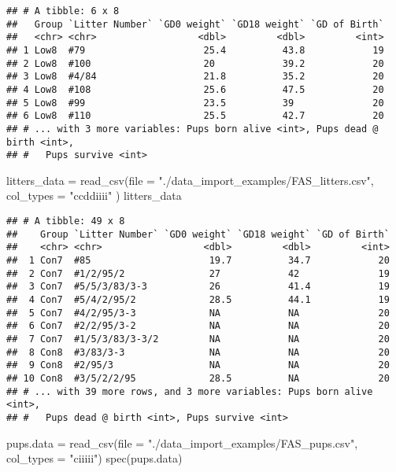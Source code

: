 \documentclass[
]{article}
\newenvironment{Shaded}{\begin{snugshade}}{\end{snugshade}}
\newcommand{\AttributeTok}[1]{\textcolor[rgb]{0.77,0.63,0.00}{#1}}
\newcommand{\FunctionTok}[1]{\textcolor[rgb]{0.00,0.00,0.00}{#1}}
\newcommand{\NormalTok}[1]{#1}
\newcommand{\OtherTok}[1]{\textcolor[rgb]{0.56,0.35,0.01}{#1}}
\newcommand{\StringTok}[1]{\textcolor[rgb]{0.31,0.60,0.02}{#1}}
\begin{document}
\begin{verbatim}
## # A tibble: 6 x 8
##   Group `Litter Number` `GD0 weight` `GD18 weight` `GD of Birth`
##   <chr> <chr>                  <dbl>         <dbl>         <int>
## 1 Low8  #79                     25.4          43.8            19
## 2 Low8  #100                    20            39.2            20
## 3 Low8  #4/84                   21.8          35.2            20
## 4 Low8  #108                    25.6          47.5            20
## 5 Low8  #99                     23.5          39              20
## 6 Low8  #110                    25.5          42.7            20
## # ... with 3 more variables: Pups born alive <int>, Pups dead @ birth <int>,
## #   Pups survive <int>
\end{verbatim}

\begin{Shaded}
\begin{Highlighting}[]
\NormalTok{litters\_data }\OtherTok{=} \FunctionTok{read\_csv}\NormalTok{(}\AttributeTok{file =} \StringTok{"./data\_import\_examples/FAS\_litters.csv"}\NormalTok{,}
  \AttributeTok{col\_types =} \StringTok{"ccddiiii"}
\NormalTok{)}
\NormalTok{litters\_data}
\end{Highlighting}
\end{Shaded}

\begin{verbatim}
## # A tibble: 49 x 8
##    Group `Litter Number` `GD0 weight` `GD18 weight` `GD of Birth`
##    <chr> <chr>                  <dbl>         <dbl>         <int>
##  1 Con7  #85                     19.7          34.7            20
##  2 Con7  #1/2/95/2               27            42              19
##  3 Con7  #5/5/3/83/3-3           26            41.4            19
##  4 Con7  #5/4/2/95/2             28.5          44.1            19
##  5 Con7  #4/2/95/3-3             NA            NA              20
##  6 Con7  #2/2/95/3-2             NA            NA              20
##  7 Con7  #1/5/3/83/3-3/2         NA            NA              20
##  8 Con8  #3/83/3-3               NA            NA              20
##  9 Con8  #2/95/3                 NA            NA              20
## 10 Con8  #3/5/2/2/95             28.5          NA              20
## # ... with 39 more rows, and 3 more variables: Pups born alive <int>,
## #   Pups dead @ birth <int>, Pups survive <int>
\end{verbatim}

\begin{Shaded}
\begin{Highlighting}[]
\NormalTok{pups.data }\OtherTok{=} \FunctionTok{read\_csv}\NormalTok{(}\AttributeTok{file =} \StringTok{"./data\_import\_examples/FAS\_pups.csv"}\NormalTok{, }\AttributeTok{col\_types =} \StringTok{"ciiiii"}\NormalTok{)}
\FunctionTok{spec}\NormalTok{(pups.data)}
\end{Highlighting}
\end{Shaded}
\end{document}
